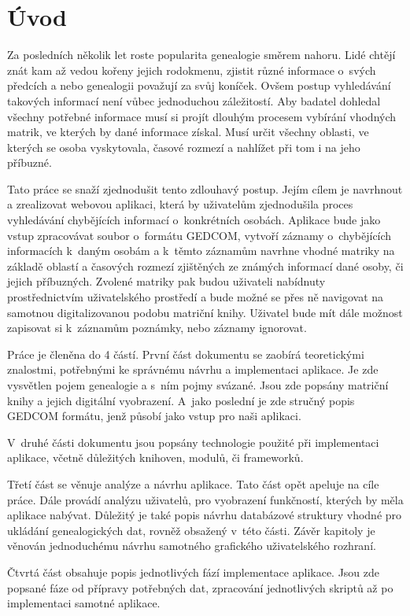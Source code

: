 \chapter{Úvod}
\label{úvod}
	Za posledních několik let roste popularita genealogie směrem nahoru. Lidé chtějí znát kam až vedou kořeny jejich rodokmenu, zjistit různé informace o~svých předcích a nebo genealogii považují za svůj koníček. Ovšem postup vyhledávání takových informací není vůbec jednoduchou záležitostí. Aby badatel dohledal všechny potřebné informace musí si projít dlouhým procesem vybírání vhodných matrik, ve kterých by dané informace získal. Musí určit všechny oblasti, ve kterých se osoba vyskytovala, časové rozmezí a nahlížet při tom i na jeho příbuzné. 
	
	Tato práce se snaží zjednodušit tento zdlouhavý postup. Jejím cílem je navrhnout a zrealizovat webovou aplikaci, která by uživatelům zjednodušila proces vyhledávání chybějících informací o~konkrétních osobách. Aplikace bude jako vstup zpracovávat soubor o~formátu GEDCOM, vytvoří záznamy o~chybějících informacích k~daným osobám a k~těmto záznamům navrhne vhodné matriky na základě oblastí a časových rozmezí zjištěných ze známých informací dané osoby, či jejich příbuzných. Zvolené matriky pak budou uživateli nabídnuty prostřednictvím uživatelského prostředí a bude možné se přes ně navigovat na samotnou digitalizovanou podobu matriční knihy. Uživatel bude mít dále možnost zapisovat si k~záznamům poznámky, nebo záznamy ignorovat. 
	
	Práce je členěna do 4 částí. První část dokumentu se zaobírá teoretickými znalostmi, potřebnými ke správnému návrhu a implementaci aplikace. Je zde vysvětlen pojem genealogie a s~ním pojmy svázané. Jsou zde popsány matriční knihy a jejich digitální vyobrazení. A~jako poslední je zde stručný popis GEDCOM formátu, jenž působí jako vstup pro naši aplikaci.
	
	V~druhé části dokumentu jsou popsány technologie použité při implementaci aplikace, včetně důležitých knihoven, modulů, či frameworků.
	
	Třetí část se věnuje analýze a návrhu aplikace. Tato část opět apeluje na cíle práce. Dále provádí analýzu uživatelů, pro vyobrazení funkčností, kterých by měla aplikace nabývat. Důležitý je také popis návrhu databázové struktury vhodné pro ukládání genealogických dat, rovněž obsažený v~této části. Závěr kapitoly je věnován jednoduchému návrhu samotného grafického uživatelského rozhraní. 
	
	Čtvrtá část obsahuje popis jednotlivých fází implementace aplikace. Jsou zde popsané fáze od přípravy potřebných dat, zpracování jednotlivých skriptů až po implementaci samotné aplikace.